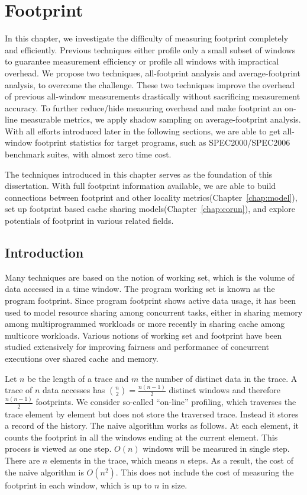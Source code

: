 \chapter{Footprint}
\label{chap:fp}

In this chapter, we investigate the difficulty of measuring footprint
completely and efficiently. Previous techniques either profile
only a small subset of windows to guarantee measurement efficiency or profile all
windows with impractical overhead. We propose two techniques, all-footprint
analysis and average-footprint analysis, to overcome the
challenge. These two techniques improve the overhead of previous
all-window measurements drastically without sacrificing
measurement accuracy. To further reduce/hide measuring overhead and
make footprint an on-line measurable metrics, we apply shadow sampling
on average-footprint analysis. With all efforts introduced
later in the following sections, we are able to get all-window
footprint statistics for target programs, such as SPEC2000/SPEC2006
benchmark suites, with almost zero time cost.

The techniques introduced in this chapter serves as the foundation of
this dissertation. With full footprint information available, we are
able to build connections between footprint and other locality
metrics(Chapter~\ref{chap:model}), set up footprint based cache
sharing models(Chapter~\ref{chap:corun}), and explore potentials of
footprint in various related fields.

\section{Introduction}
Many techniques are based on the notion of working set, which is
the volume of data accessed in a time window. The program working set is
known as the program footprint. Since program footprint shows active
data usage, it has been used to model resource sharing among
concurrent tasks, either in sharing memory among multiprogrammed
workloads or more recently in sharing cache among multicore workloads.
Various notions of working set and footprint have been studied extensively
for improving fairness and performance of concurrent executions
over shared cache and memory.

Let $n$ be the length of a trace and $m$ the number of distinct
data in the trace. A trace of $n$ data accesses has ${{n}\choose{2}} = \frac{n (n-1)}{2}$
distinct windows and therefore $\frac{n (n-1)}{2}$ footprints.
We consider so-called ``on-line'' profiling, which
traverses the trace element by element but does not store the
traversed trace.  Instead it stores a record of the
history.  The naive algorithm works as follows.  At each element, it
counts the footprint in all the windows ending at the current element.
This process is viewed as one step.
$O(n)$ windows will be measured in single step. There are $n$ elements
in the trace, which means $n$ steps. As a result, the cost of the
naive algorithm is $O(n^2)$.  This does not include the cost
of measuring the footprint in each window, which is up to $n$ in size.

